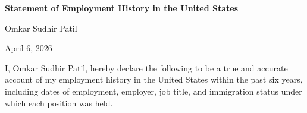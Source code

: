 \documentclass[11pt, letterpaper]{article}
\begin{document}
\begin{center}
    {\Large \textbf{Statement of Employment History in the United States}}

    \vspace{0.3cm}

    {\large Omkar Sudhir Patil}

    \vspace{0.1cm}

    April 6, 2026
\end{center}

\vspace{0.5cm}

I, Omkar Sudhir Patil, hereby declare the following to be a true and accurate account of my employment history in the United States within the past six years, including dates of employment, employer, job title, and immigration status under which each position was held.

\vspace{0.5cm}
\end{document}
